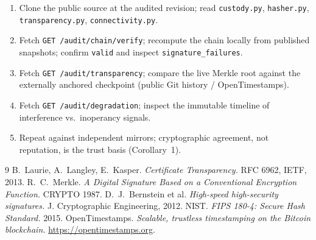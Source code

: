 \documentclass[11pt,a4paper]{article}
\theoremstyle{plain}
\theoremstyle{definition}
\theoremstyle{remark}
\newcommand{\code}[1]{\texttt{#1}}
\begin{document}
\begin{enumerate}[leftmargin=1.4em]
  \item Clone the public source at the audited revision; read
  \code{custody.py}, \code{hasher.py}, \code{transparency.py},
  \code{connectivity.py}.
  \item Fetch \code{GET /audit/chain/verify}; recompute the chain
  locally from published snapshots; confirm \code{valid} and inspect
  \code{signature\_failures}.
  \item Fetch \code{GET /audit/transparency}; compare the live Merkle
  root against the externally anchored checkpoint (public Git history /
  OpenTimestamps).
  \item Fetch \code{GET /audit/degradation}; inspect the immutable
  timeline of interference vs.\ inoperancy signals.
  \item Repeat against independent mirrors; cryptographic agreement,
  not reputation, is the trust basis (Corollary~1).
\end{enumerate}

\begin{thebibliography}{9}
 B.~Laurie, A.~Langley, E.~Kasper.
\emph{Certificate Transparency.} RFC 6962, IETF, 2013.
 R.~C.~Merkle. \emph{A Digital Signature Based on a
Conventional Encryption Function.} CRYPTO 1987.
 D.~J.~Bernstein et al.
\emph{High-speed high-security signatures.} J. Cryptographic
Engineering, 2012.
 NIST. \emph{FIPS 180-4: Secure Hash Standard.} 2015.
 OpenTimestamps. \emph{Scalable, trustless timestamping on
the Bitcoin blockchain.} \url{https://opentimestamps.org}.
\end{thebibliography}
\end{document}
